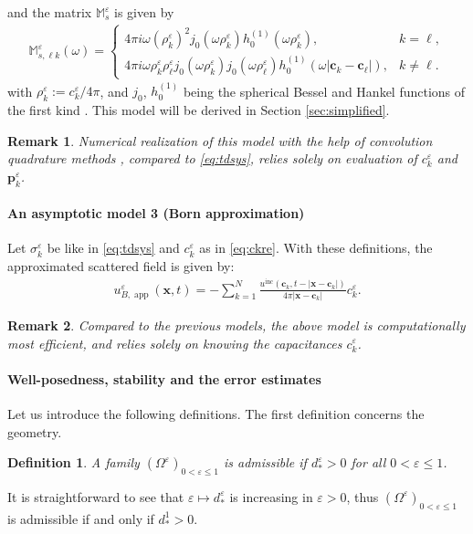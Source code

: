 \documentclass[]{article}
\newtheorem{remark}{Remark}
\newtheorem{definition}{Definition}
\numberwithin{equation}{section}
\numberwithin{theorem}{section}
\numberwithin{lemma}{section}
\numberwithin{corollary}{section}
\numberwithin{proposition}{section}
\numberwithin{definition}{section}
\newcommand{\bc}{\boldsymbol{c}}
\newcommand{\re}{\varepsilon}
\renewcommand{\vec}{\boldsymbol}
\begin{document}
	and the matrix $\mathbb{M}^{\re}_{s} $ is given by
	\begin{align*}%
		\mathbb{M}^{\re}_{s, \ell k}(\omega)=
		\left\{
		\begin{array}{ll}
			4 \pi i \omega (\rho^{\re}_k)^2 j_0(\omega \rho^{\re}_k) h^{(1)}_0(\omega \rho^{\re}_k), &k = \ell, \\
			4 \pi i \omega \rho^{\re}_k \rho^{\re}_{\ell} j_0(\omega \rho^{\re}_k) j_0(\omega \rho^{\re}_{\ell}) h^{(1)}_0(\omega |\bc_k - \bc_{\ell}| ), &k \neq \ell.
		\end{array}
		\right.
	\end{align*}
	with $\rho^{\re}_k:= c^{\re}_k/4 \pi$, and  $j_0$, $h^{(1)}_0$ being the spherical Bessel and Hankel functions of the first kind \cite[Chapter 10.47]{nist}. This model will be derived in Section \ref{sec:simplified}.
	\begin{remark}
		Numerical realization of this model with the help of convolution quadrature methods \cite{lubich88_1, lubich88_2, lubich94}, compared to \eqref{eq:tdsys}, relies solely on evaluation of $c_k^{\re}$ and $\vec{p}_k^{\re}$. 
	\end{remark}
	\paragraph{An asymptotic model 3 (Born approximation)}
	Let $\sigma_k^{\re}$ be like in \eqref{eq:tdsys} and $c_k^{\re}$ as in \eqref{eq:ckre}. With these definitions, the approximated scattered field is given by: 
	\begin{align}
		\label{eq:tdsysborn}
		{u}^{\varepsilon}_{B,\operatorname{\operatorname{app}}}(\vec{x},t)=-\sum\limits_{k=1}^N\frac{u^{\operatorname{inc}}(\vec{c}_k,t-|\vec{x}-\bc_k|)}{4\pi|\vec{x}-\bc_k|}c_k^{\varepsilon}.
	\end{align}
	\begin{remark}
		Compared to the previous models, the above model is computationally most efficient, and relies solely on knowing the capacitances $c_k^{\re}$.
	\end{remark}
	\paragraph{Well-posedness, stability and the error estimates} 
	Let us introduce the following definitions. The first definition concerns the geometry.
	\begin{definition}
		\label{def:admissible}
		A family $(\Omega^{\re})_{0<\re\leq 1}$ is admissible if $d^{\re}_*>0$ for all $0<\re\leq 1$. 
	\end{definition}
	It is straightforward to see that $\re\mapsto d^{\re}_*$ is increasing in $\re>0$, thus $(\Omega^{\re})_{0<\re\leq 1}$ is admissible if and only if $d^{1}_*>0$.
	
\end{document}
